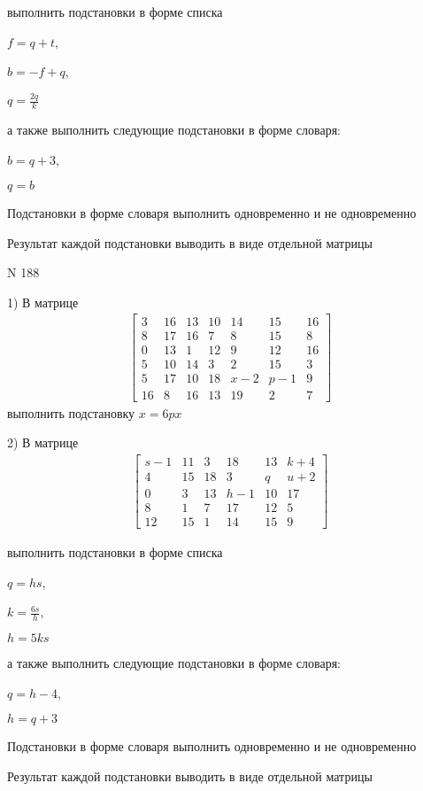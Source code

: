\documentclass[11pt]{report}
\begin{document}
выполнить подстановки в форме списка

$f=q + t$,

$b=- f + q$,

$q=\frac{2 q}{k}$

а также выполнить следующие подстановки в форме словаря:

$b=q + 3$,

$q=b$


    Подстановки в форме словаря выполнить одновременно и не одновременно


    Результат каждой подстановки выводить в виде отдельной матрицы

\newpage
N 188


    1) В матрице
\begin{align*}
\left[\begin{matrix}3 & 16 & 13 & 10 & 14 & 15 & 16\\8 & 17 & 16 & 7 & 8 & 15 & 8\\0 & 13 & 1 & 12 & 9 & 12 & 16\\5 & 10 & 14 & 3 & 2 & 15 & 3\\5 & 17 & 10 & 18 & x - 2 & p - 1 & 9\\16 & 8 & 16 & 13 & 19 & 2 & 7\end{matrix}\right]
\end{align*}
выполнить подстановку $x=6 p x$


    2) В матрице
\begin{align*}
\left[\begin{matrix}s - 1 & 11 & 3 & 18 & 13 & k + 4\\4 & 15 & 18 & 3 & q & u + 2\\0 & 3 & 13 & h - 1 & 10 & 17\\8 & 1 & 7 & 17 & 12 & 5\\12 & 15 & 1 & 14 & 15 & 9\end{matrix}\right]
\end{align*}

выполнить подстановки в форме списка

$q=h s$,

$k=\frac{6 s}{h}$,

$h=5 k s$

а также выполнить следующие подстановки в форме словаря:

$q=h - 4$,

$h=q + 3$


    Подстановки в форме словаря выполнить одновременно и не одновременно


    Результат каждой подстановки выводить в виде отдельной матрицы
\end{document}
